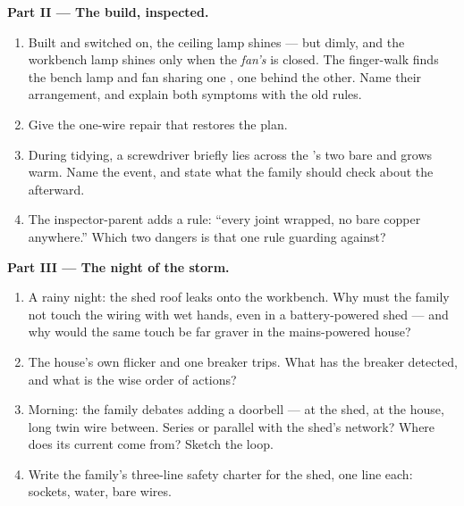 \begin{problem}
\medskip\noindent\textbf{Part II --- The build, inspected.}
\begin{enumerate}[resume]
  \item Built and switched on, the ceiling lamp shines --- but
        dimly, and the workbench lamp shines only when the
        \emph{fan's}  is closed. The finger-walk finds the
        bench lamp and fan sharing one , one behind the
        other. Name their arrangement, and explain both symptoms
        with the old rules.
  \item Give the one-wire repair that restores the plan.
  \item During tidying, a screwdriver briefly lies across the
        's two bare  and grows warm. Name the
        event, and state what the family should check about the
         afterward.
  \item The inspector-parent adds a rule: ``every joint wrapped,
        no bare copper anywhere.'' Which two dangers is that one
        rule guarding against?
\end{enumerate}

\medskip\noindent\textbf{Part III --- The night of the storm.}
\begin{enumerate}[resume]
  \item A rainy night: the shed roof leaks onto the workbench.
        Why must the family not touch the wiring with wet hands,
        even in a battery-powered shed --- and why would the same
        touch be far graver in the mains-powered house?
  \item The house's own  flicker and one breaker trips.
        What has the breaker detected, and what is the wise order
        of actions?
  \item Morning: the family debates adding a doorbell --- 
        at the shed,  at the house, long twin wire
        between. Series or parallel with the shed's network?
        Where does its current come from? Sketch the loop.
  \item Write the family's three-line safety charter for the
        shed, one line each: sockets, water, bare wires.
\end{enumerate}
\end{problem}
